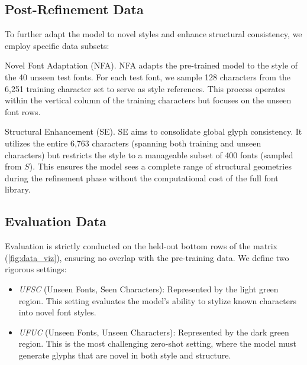


\subsection{Post-Refinement Data}
\label{ssec:data_refine}
To further adapt the model to novel styles and enhance structural consistency, we employ specific data subsets:

\noindent Novel Font Adaptation (NFA). NFA adapts the pre-trained model to the style of the 40 unseen test fonts. For each test font, we sample 128 characters from the 6,251 training character set to serve as style references. This process operates within the vertical column of the training characters but focuses on the unseen font rows.

\noindent Structural Enhancement (SE). SE aims to consolidate global glyph consistency. It utilizes the entire 6,763 characters (spanning both training and unseen characters) but restricts the style to a manageable subset of 400 fonts (sampled from $S$). This ensures the model sees a complete range of structural geometries during the refinement phase without the computational cost of the full font library.


\subsection{Evaluation Data}
\label{ssec:data_eval}
Evaluation is strictly conducted on the held-out bottom rows of the matrix (\cref{fig:data_viz}), ensuring no overlap with the pre-training data. We define two rigorous settings:
\begin{itemize}[leftmargin=*]
    \item \textit{UFSC} (Unseen Fonts, Seen Characters): Represented by the light green region. This setting evaluates the model's ability to stylize known characters into novel font styles.
    \item \textit{UFUC} (Unseen Fonts, Unseen Characters): Represented by the dark green region. This is the most challenging zero-shot setting, where the model must generate glyphs that are novel in both style and structure.
\end{itemize}



